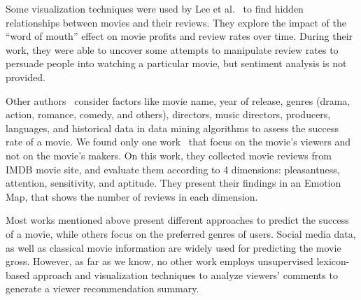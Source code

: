 Some visualization techniques were used by Lee et al.~\cite{VisualizationMovie} to find hidden relationships between movies and their reviews. They explore the impact of the ``word of mouth'' effect on movie profits and review rates over time. During their work, they were able to uncover some attempts to manipulate review rates to persuade people into watching a particular movie, but sentiment analysis is not provided.


Other authors~\cite{2017MoviePredictionData} consider factors like movie name, year of release, genres (drama, action, romance, comedy, and others), directors, music directors, producers, languages, and historical data in data mining algorithms to assess the success rate of a movie.
We found only one work~\cite{2016EmotionsIMDB} that focus on the movie's viewers and not on the movie's makers. On this work, they collected movie reviews from IMDB movie site, and evaluate them according to 4 dimensions: pleasantness, attention, sensitivity, and aptitude. They present their findings in an Emotion Map, that shows the number of reviews in each dimension.

Most works mentioned above present different approaches to predict the success of a movie, while others focus on the preferred genres of users. Social media data, as well as classical movie information are widely used for predicting the movie gross. However, as far as we know, no other work employs unsupervised lexicon-based approach and visualization techniques to analyze viewers' comments to generate a viewer recommendation summary.


